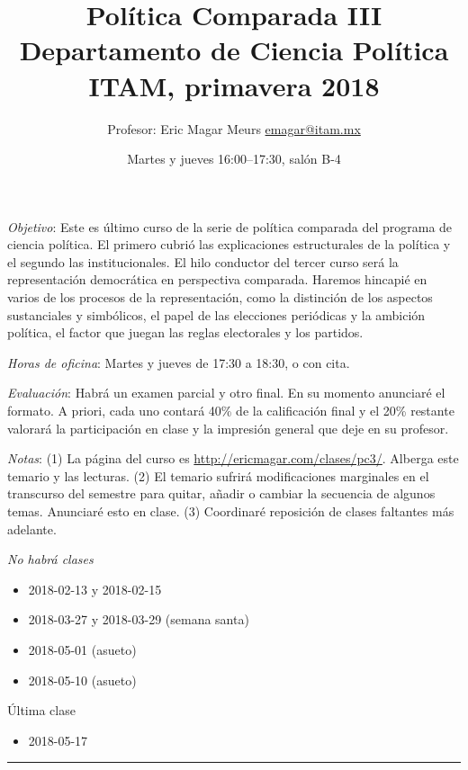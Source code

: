 \documentclass{article}
\author{Profesor: Eric Magar Meurs \url{emagar@itam.mx}}
\date{Martes y jueves 16:00--17:30, salón B-4}
\title{Política Comparada III\\\medskip
\large Departamento de Ciencia Política ITAM, primavera 2018}
\begin{document}
\maketitle
\noindent \emph{Objetivo}: Este es último curso de la serie de política comparada del programa de ciencia política. El primero cubrió las explicaciones estructurales de la política y el segundo las institucionales. El hilo conductor del tercer curso será la representación democrática en perspectiva comparada. Haremos hincapié en varios de los procesos de la representación, como la distinción de los aspectos sustanciales y simbólicos, el papel de las elecciones periódicas y la ambición política, el factor que juegan las reglas electorales y los partidos.

\bigskip

\noindent \emph{Horas de oficina}: Martes y jueves de 17:30 a 18:30, o con cita.  

\bigskip

\noindent \emph{Evaluación}: Habrá un examen parcial y otro final. En su momento anunciaré el formato. A priori, cada uno contará 40\% de la calificación final y el 20\% restante valorará la participación en clase y la impresión general que deje en su profesor.  

\bigskip

\noindent \emph{Notas}: (1) La página del curso es \url{http://ericmagar.com/clases/pc3/}. Alberga este temario y las lecturas. (2) El temario sufrirá modificaciones marginales en el transcurso del semestre para quitar, añadir o cambiar la secuencia de algunos temas. Anunciaré esto en clase. (3) Coordinaré reposición de clases faltantes más adelante.

\bigskip

\noindent \emph{No habrá clases}
\begin{itemize}
\item 2018-02-13 y 2018-02-15
\item 2018-03-27 y 2018-03-29 (semana santa)
\item 2018-05-01 (asueto)
\item 2018-05-10 (asueto)
\end{itemize}

\bigskip

\noindent Última clase
\begin{itemize}
\item 2018-05-17
\end{itemize}

\noindent\rule{\textwidth}{0.5pt}
\end{document}
